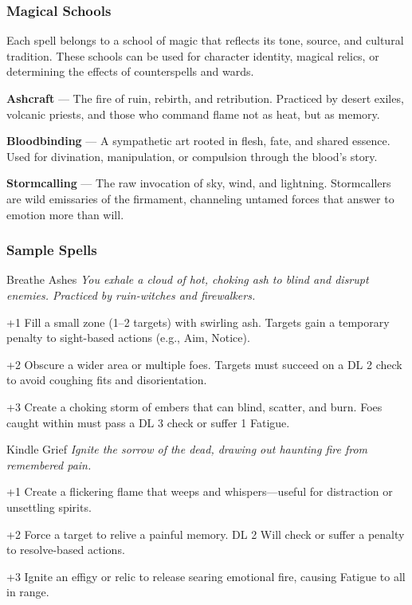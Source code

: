 \subsubsection*{Magical Schools}

Each spell belongs to a school of magic that reflects its tone, source, and cultural tradition. These schools can be used for character identity, magical relics, or determining the effects of counterspells and wards.

\vspace{0.5\baselineskip}
\textbf{Ashcraft} — The fire of ruin, rebirth, and retribution. Practiced by desert exiles, volcanic priests, and those who command flame not as heat, but as memory.

\textbf{Bloodbinding} — A sympathetic art rooted in flesh, fate, and shared essence. Used for divination, manipulation, or compulsion through the blood’s story.

\textbf{Stormcalling} — The raw invocation of sky, wind, and lightning. Stormcallers are wild emissaries of the firmament, channeling untamed forces that answer to emotion more than will.

\subsubsection*{Sample Spells}

\begin{WyrdSpell}[Ashcraft]{Breathe Ashes}
\textit{You exhale a cloud of hot, choking ash to blind and disrupt enemies. Practiced by ruin-witches and firewalkers.}
    \begin{WyrdSpellBlock}
        \item[+1] Fill a small zone (1–2 targets) with swirling ash. Targets gain a temporary penalty to sight-based actions (e.g., Aim, Notice).
        \item[+2] Obscure a wider area or multiple foes. Targets must succeed on a DL 2 check to avoid coughing fits and disorientation.
        \item[+3] Create a choking storm of embers that can blind, scatter, and burn. Foes caught within must pass a DL 3 check or suffer 1 Fatigue.
    \end{WyrdSpellBlock}
\end{WyrdSpell}

\begin{WyrdSpell}[Ashcraft]{Kindle Grief}
\textit{Ignite the sorrow of the dead, drawing out haunting fire from remembered pain.}
    \begin{WyrdSpellBlock}
        \item[+1] Create a flickering flame that weeps and whispers—useful for distraction or unsettling spirits.
        \item[+2] Force a target to relive a painful memory. DL 2 Will check or suffer a penalty to resolve-based actions.
        \item[+3] Ignite an effigy or relic to release searing emotional fire, causing Fatigue to all in range.
    \end{WyrdSpellBlock}
\end{WyrdSpell}


